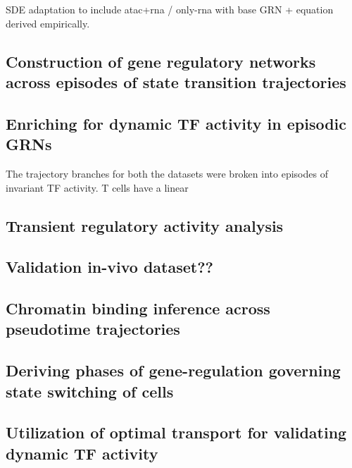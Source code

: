 \documentclass[11pt]{article}
\begin{document}
SDE adaptation to include atac+rna / only-rna with base GRN + equation derived
empirically.

\subsection*{Construction of gene regulatory networks across episodes of state transition trajectories}


\subsection*{Enriching for dynamic TF activity in episodic GRNs}

The trajectory branches for both the datasets were broken into episodes of invariant TF
activity. T cells have a linear

\subsection*{Transient regulatory activity analysis}


\subsection*{Validation in-vivo dataset??}


\subsection*{Chromatin binding inference across pseudotime trajectories}


\subsection*{Deriving phases of gene-regulation governing state switching of cells}


\subsection*{Utilization of optimal transport for validating dynamic TF activity}
\end{document}
